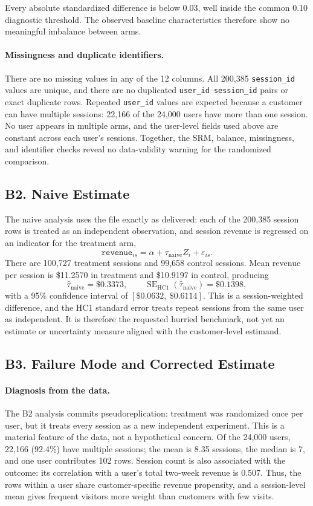 \documentclass[11pt]{article}
\begin{document}
Every absolute standardized difference is below 0.03, well inside the common
0.10 diagnostic threshold. The observed baseline characteristics therefore
show no meaningful imbalance between arms.

\paragraph{Missingness and duplicate identifiers.}
There are no missing values in any of the 12 columns. All 200,385
\texttt{session\_id} values are unique, and there are no duplicated
\texttt{user\_id}--\texttt{session\_id} pairs or exact duplicate rows.
Repeated \texttt{user\_id} values are expected because a customer can have
multiple sessions: 22,166 of the 24,000 users have more than one session.
No user appears in multiple arms, and the user-level fields used above are
constant across each user's sessions. Together, the SRM, balance, missingness,
and identifier checks reveal no data-validity warning for the randomized
comparison.

\subsection*{B2. Naive Estimate}

The naive analysis uses the file exactly as delivered: each of the 200,385
session rows is treated as an independent observation, and session revenue is
regressed on an indicator for the treatment arm,
\[
    \texttt{revenue}_{is}=\alpha+\tau_{\mathrm{naive}}Z_i+\varepsilon_{is}.
\]
There are 100,727 treatment sessions and 99,658 control sessions. Mean revenue
per session is \$11.2570 in treatment and \$10.9197 in control, producing
\[
    \widehat{\tau}_{\mathrm{naive}}=\$0.3373,
    \qquad
    \operatorname{SE}_{\mathrm{HC1}}(\widehat{\tau}_{\mathrm{naive}})=\$0.1398,
\]
with a 95\% confidence interval of $[\$0.0632,\ \$0.6114]$. This is a
session-weighted difference, and the HC1 standard error treats repeat sessions
from the same user as independent. It is therefore the requested hurried
benchmark, not yet an estimate or uncertainty measure aligned with the
customer-level estimand.

\subsection*{B3. Failure Mode and Corrected Estimate}

\paragraph{Diagnosis from the data.}
The B2 analysis commits pseudoreplication: treatment was randomized once per
user, but it treats every session as a new independent experiment. This is a
material feature of the data, not a hypothetical concern. Of the 24,000
users, 22,166 (92.4\%) have multiple sessions; the mean is 8.35 sessions, the
median is 7, and one user contributes 102 rows. Session count is also
associated with the outcome: its correlation with a user's total two-week
revenue is 0.507. Thus, the rows within a user share customer-specific revenue
propensity, and a session-level mean gives frequent visitors more weight than
customers with few visits.
\end{document}
